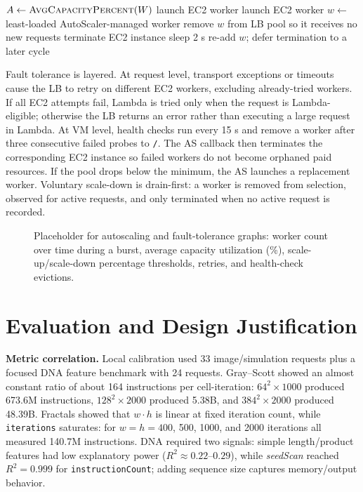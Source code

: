 \documentclass[10pt]{article}
\newcommand{\whiteplaceholder}[2]{%
  \begin{center}
  \fcolorbox{black}{white}{\rule{0pt}{#2}\rule{#1}{0pt}}
  \end{center}%
}
\begin{document}
\begin{algorithm}[H]
\caption{Auto-scaling over worker set $W$}
\label{alg:as}
\begin{algorithmic}[1]
  \State $A\gets\Call{AvgCapacityPercent}{W}$
    \State \Return
  \EndIf
    \State launch EC2 worker
    \State launch EC2 worker
    \State $w\gets$ least-loaded AutoScaler-managed worker
    \State remove $w$ from LB pool so it receives no new requests
        \State terminate EC2 instance
        \State \Return
      \EndIf
      \State sleep 2 s
    \EndFor
    \State re-add $w$; defer termination to a later cycle
  \EndIf
\EndProcedure
\end{algorithmic}
\end{algorithm}

Fault tolerance is layered. At request level, transport exceptions or timeouts cause the LB to retry on different EC2 workers, excluding already-tried workers. If all EC2 attempts fail, Lambda is tried only when the request is Lambda-eligible; otherwise the LB returns an error rather than executing a large request in Lambda. At VM level, health checks run every 15 s and remove a worker after three consecutive failed probes to \texttt{/}. The AS callback then terminates the corresponding EC2 instance so failed workers do not become orphaned paid resources. If the pool drops below the minimum, the AS launches a replacement worker. Voluntary scale-down is drain-first: a worker is removed from selection, observed for active requests, and only terminated when no active request is recorded.

\begin{figure}[H]
\whiteplaceholder{0.88\columnwidth}{0.58\columnwidth}
\caption{Placeholder for autoscaling and fault-tolerance graphs: worker count over time during a burst, average capacity utilization (\%), scale-up/scale-down percentage thresholds, retries, and health-check evictions.}
\label{fig:autoscale}
\end{figure}

\section{Evaluation and Design Justification}

\textbf{Metric correlation.} Local calibration used 33 image/simulation requests plus a focused DNA feature benchmark with 24 requests. Gray--Scott showed an almost constant ratio of about 164 instructions per cell-iteration: $64^2\times1000$ produced 673.6M instructions, $128^2\times2000$ produced 5.38B, and $384^2\times2000$ produced 48.39B. Fractals showed that $w\cdot h$ is linear at fixed iteration count, while \texttt{iterations} saturates: for $w=h=400$, 500, 1000, and 2000 iterations all measured 140.7M instructions. DNA required two signals: simple length/product features had low explanatory power ($R^2\approx0.22$--$0.29$), while \emph{seedScan} reached $R^2=0.999$ for \texttt{instructionCount}; adding sequence size captures memory/output behavior.
\end{document}
